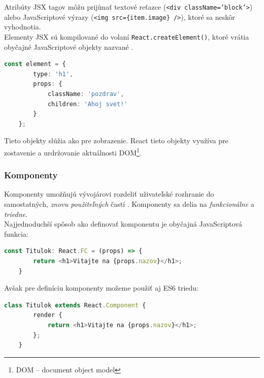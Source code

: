 \bigskip

\noindent Atribúty JSX tagov môžu prijímať textové reťazce (\texttt{<div className='block'>}) alebo JavaScriptové výrazy (\texttt{<img src=\{item.image\} />}), ktoré sa neskôr vyhodnotia. \\

\noindent Elementy JSX sú kompilované do volaní \texttt{React.createElement()}, ktoré vrátia obyčajné JavaScriptové objekty nazvané . \cite{React}

\bigskip

\begin{lstlisting}[language=TypeScript, caption=Príklad jednoduchého React elementu po kompilácií. \cite{React}]
	const element = {
		type: 'h1',
		props: {
			className: 'pozdrav',
			children: 'Ahoj svet!'
		}
	};
\end{lstlisting}

\bigskip

\noindent Tieto objekty slúžia ako  pre zobrazenie. React tieto objekty využíva pre zostavenie a urdržovanie aktuálnosti DOM\footnote{DOM -- document object model}. \cite{React}

\subsubsection{Komponenty}
\label{subsubsection:components}
Komponenty umožňujú vývojárovi rozdeliť uživateľské rozhranie do samostatných, \emph{znovu použiteľných} častí \cite{React}. Komponenty sa delia na \emph{funkcionálne} a \emph{triedne}. \\

\noindent Najjednoduchší spôsob ako definovať komponentu je obyčajná JavaScriptová funkcia: \\

\begin{lstlisting}[language=TypeScript, caption=Príklad definície funkcionálnej komponenty.]
	const Titulok: React.FC = (props) => {
		return <h1>Vitajte na {props.nazov}</h1>;
	}
\end{lstlisting}

\bigskip

\noindent Avšak pre definíciu komponenty možeme použiť aj ES6 triedu: \\

\begin{lstlisting}[language=TypeScript, caption=Príklad definície triednej komponenty.]
	class Titulok extends React.Component {
		render {
			return <h1>Vitajte na {props.nazov}</h1>;
		};
	}
\end{lstlisting}

